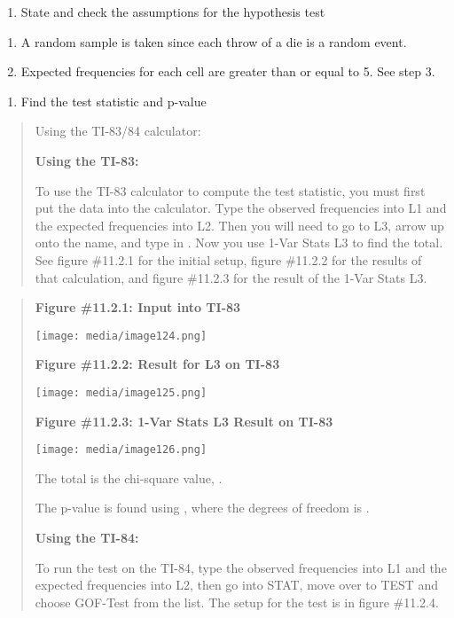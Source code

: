 \documentclass[]{book}
\providecommand{\tightlist}{%
  \setlength{\itemsep}{0pt}\setlength{\parskip}{0pt}}
\begin{document}
\begin{enumerate}
\def\labelenumi{\arabic{enumi}.}
\setcounter{enumi}{1}
\tightlist
\item
  State and check the assumptions for the hypothesis test
\end{enumerate}

\begin{enumerate}
\def\labelenumi{\alph{enumi}.}
\item
  A random sample is taken since each throw of a die is a random
  event.
\item
  Expected frequencies for each cell are greater than or equal to 5.
  See step 3.
\end{enumerate}

\begin{enumerate}
\def\labelenumi{\arabic{enumi}.}
\setcounter{enumi}{2}
\tightlist
\item
  Find the test statistic and p-value
\end{enumerate}

\begin{quote}
Using the TI-83/84 calculator:

\textbf{Using the TI-83:}

To use the TI-83 calculator to compute the test statistic, you must first put the data into the calculator. Type the observed frequencies into L1 and the expected frequencies into L2. Then you will need to go to L3, arrow up onto the name, and type in . Now you use 1-Var Stats L3 to find the total. See figure \#11.2.1 for the initial setup, figure \#11.2.2 for the results of that calculation, and figure \#11.2.3 for the result of the 1-Var Stats L3.
\end{quote}

\begin{quote}
\textbf{Figure \#11.2.1: Input into TI-83}

\texttt{[image: media/image124.png]}

\textbf{Figure \#11.2.2: Result for L3 on TI-83}

\texttt{[image: media/image125.png]}

\textbf{Figure \#11.2.3: 1-Var Stats L3 Result on TI-83}

\texttt{[image: media/image126.png]}

The total is the chi-square value, .

The p-value is found using , where the degrees of freedom is .

\textbf{Using the TI-84:}

To run the test on the TI-84, type the observed frequencies into L1 and the expected frequencies into L2, then go into STAT, move over to TEST and choose GOF-Test from the list. The setup for the test is in figure \#11.2.4.
\end{quote}
\end{document}
